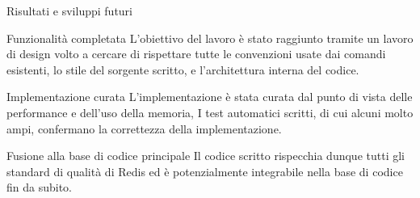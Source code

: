 \documentclass{beamer}
\begin{document}
	\begin{frame}{Risultati e sviluppi futuri}

		\begin{block}{Funzionalità completata}
		L'obiettivo del lavoro è stato raggiunto tramite
		un lavoro di design volto a cercare di rispettare tutte le convenzioni usate dai comandi esistenti, lo stile del sorgente scritto, e  l'architettura interna del codice.
		\end{block}

		\begin{block}{Implementazione curata}
		L'implementazione è stata curata dal punto di vista delle performance e dell'uso della memoria, I test automatici scritti, di cui alcuni molto ampi, confermano la correttezza della implementazione.
		\end{block}

		\begin{block}{Fusione alla base di codice principale}
		Il codice scritto rispecchia dunque tutti gli standard di qualità di Redis ed è potenzialmente integrabile nella base di codice fin da subito.
		\end{block}

	\end{frame}
\end{document}
